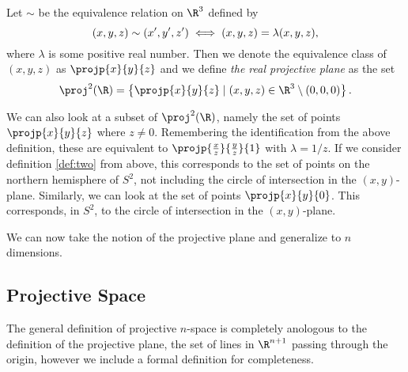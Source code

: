 \documentclass[a4paper]{article}
\begin{document}
    \begin{defn}
        Let $\sim$ be the equivalence relation on $\R^3$ defined by
        \begin{equation}
            \notag
            (x, y, z) \sim (x', y', z') \iff (x, y, z) = \lambda(x, y, z),
        \end{equation}
        where $\lambda$ is some positive real number. Then we denote the
        equivalence class of $(x, y, z)$ as $\projp{x}{y}{z}$ and we define
        \emph{the real projective plane} as the set
        \begin{equation}
            \notag
            \proj^2(\R) = \left\{ \projp{x}{y}{z} \mid (x, y, z) \in \R^3 \setminus
            (0, 0, 0) \right\}.
        \end{equation}
    \end{defn}

    We can also look at a subset of $\proj^2(\R)$, namely the set of points
    $\projp{x}{y}{z}$ where $z \neq 0$. Remembering the identification from the
    above definition, these are equivalent to $\projp{\frac{x}{z}}{\frac{y}{z}}{1}$
    with $\lambda = 1 / z$. If we consider definition \ref{def:two} from above,
    this corresponds to the set of points on the northern hemisphere of $S^2$, not
    including the circle of intersection in the $(x,y)$-plane. Similarly, we can
    look at the set of points $\projp{x}{y}{0}$. This corresponds, in $S^2$, to the
    circle of intersection in the $(x, y)$-plane. 

    We can now take the notion of the projective plane and generalize to $n$
    dimensions.
    \subsection{Projective Space}
    \label{sub:projective_space}

    The general definition of projective $n$-space is completely anologous to the
    definition of the projective plane, the set of lines in $\R^{n+1}$ passing
    through the origin, however we include a formal definition for completeness.
\end{document}
